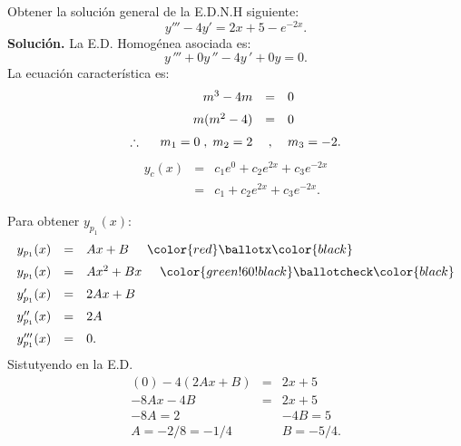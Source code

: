 \documentclass[9pt]{beamer}
\begin{document}
\begin{frame}[t]
	\begin{example}
		Obtener la solución general de la E.D.N.H siguiente:
		\[
			y''' -4y' = 2x+5-e^{-2x}.
		\]
	\textbf{Solución.} La E.D. Homogénea asociada es:
		\[
			y\,''' + 0y\,'' - 4y\,' + 0y =0.
		\]
		La ecuación característica es:
		\[
			\begin{array}{rcl}
				m^3-4m & = & 0 \\[2mm]
				m(m^2-4) & = & 0 \\[2mm]
				\therefore \hspace{5mm} m_1=0 \;,\; m_2=2 &,& m_3  = -2.
			\end{array}
		\]
		\[
			\begin{array}{rcl}
				y_c(x) & = & c_1e^{0} + c_2e^{2x} + c_3e^{-2x} \\[2mm]
				& = & c_1+c_2e^{2x} +c_3e^{-2x} .
			\end{array}
		\]
	\end{example}
\end{frame}

\begin{frame}[t]
	\begin{exampleblock}{}
		Para obtener \(y_{p_1} (x)\):
		\[
			\begin{array}{rcl}
				y_{p_1} (x) & = & Ax+B \hspace{5mm} \color{red} \ballotx \color{black} \\[2mm]
				y_{p_1} (x) & = & Ax^2+Bx \hspace{5mm}\color{green!60!black} \ballotcheck \color{black}\\[2mm]
				y_{p_1}' (x) & = & 2Ax+B \\[2mm]
				y_{p_1} '' (x) & = & 2A \\[2mm]
				y_{p_1} ''' (x) & = & 0.
			\end{array}
		\]
		Sistutyendo en la E.D.
		\[
			\begin{array}{rcl}
				(0) -4(2Ax+B) & = & 2x+5 \\[2mm]
				-8Ax-4B & = & 2x+5 \\[2mm]
				-8A = 2 && -4B = 5 \\[2mm]
				A = -2/8=-1/4 && B = -5/4.
			\end{array}
		\]
	\end{exampleblock}
\end{frame}
\end{document}
